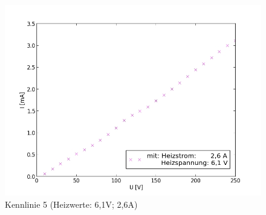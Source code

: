 	\begin{figure}[h]
		\begin{center}
		\includegraphics[scale=0.75]{pica5.jpg}
		\caption{Kennlinie 5 (Heizwerte: 6,1V; 2,6A)}
		\label{pica5}
		\end{center}	
	\end{figure}